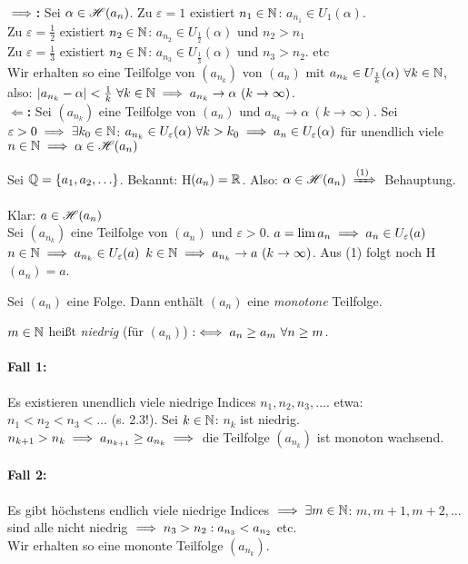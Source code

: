 \documentclass[a4paper,oneside,DIV15,BCOR12mm]{scrbook}
\begin{document}
\begin{beweise}
\item \textbf{\glqq$\implies$\grqq:} Sei $\alpha\in \mathscr{H}(a_n)$. Zu $\varepsilon = 1$ existiert $n_1\in\mathbb{N}$: $a_{n_1}\in U_1(\alpha)$. \\
Zu $\varepsilon =\frac{1}{2}$ existiert $n_2\in\mathbb{N}$: $a_{n_2} \in U_{\frac{1}{2}}(\alpha)$ und $n_2>n_1$ \\
Zu $\varepsilon =\frac{1}{3}$ existiert $n_2\in\mathbb{N}$: $a_{n_3} \in U_{\frac{1}{3}}(\alpha)$ und $n_3>n_2$. etc \\
Wir erhalten so eine Teilfolge von $(a_{n_k})$ von $(a_n)$ mit $a_{n_k} \in U_{\frac{1}{k}}(\alpha) \ \forall k\in\MdN$, also: $|a_{n_k} - \alpha| < \frac{1}{k} \ \forall k\in\MdN \folgt a_{n_k} \to \alpha \ (k\to\infty)$. \\
\textbf{\glqq$\Leftarrow$\grqq:} Sei $(a_{n_k})$ eine Teilfolge von $(a_n)$ und  $a_{n_k} \to \alpha\ (k\to\infty)$. Sei $\varepsilon > 0 \implies \exists k_0 \in\mathbb{N}$: $a_{n_k} \in U_\varepsilon(\alpha) \ \forall k>k_0 \implies a_n \in U_\varepsilon(\alpha)$ für unendlich viele $n\in\mathbb{N} \implies \alpha \in \mathscr{H}(a_n)$
\item Sei $\mathbb{Q} = \{a_1, a_2, \ldots\}$. Bekannt: H$(a_n) = \mathbb{R}$. Also: $\alpha \in \H(a_n) \folgtnach{(1)}$ Behauptung.
\item Klar: $a \in \mathscr{H}(a_n)$\\
Sei $(a_{n_k})$ eine Teilfolge von $(a_n)$ und $\varepsilon > 0 $. $a = \lim a_n \implies a_n \in U_\varepsilon(a)$ \ffa $n\in\mathbb{N} \implies a_{n_k} \in U_\varepsilon(a)$ \ffa $k\in\mathbb{N} \implies a_{n_k} \to a\ (k\to\infty)$. Aus (1) folgt noch H$(a_n) = {a}$.
\end{beweise}


\begin{hilfssatz}
Sei $(a_n)$ eine Folge. Dann enthält $(a_n)$ eine \textit{monotone} Teilfolge.
\end{hilfssatz}

\begin{beweis}
$m\in\mathbb{N}$ heißt \textit{niedrig} (für $(a_n)$) $:\iff a_n \ge a_m \ \forall n\ge m$.
\paragraph{Fall 1:} Es existieren unendlich viele niedrige Indices $n_1,n_2,n_3,\ldots$. etwa: $n_1 < n_2 < n_3 < \ldots$ (s. 2.3!). Sei $k\in\mathbb{N}$: $n_k$ ist niedrig. $n_{k+1} > n_k \implies a_{n_{k+1}} \ge a_{n_k} \implies$ die Teilfolge $(a_{n_k})$ ist monoton wachsend.
\paragraph{Fall 2:} Es gibt höchstens endlich viele niedrige Indices $\implies \exists m\in\mathbb{N}$: $m, m+1, m+2,\ldots$ sind alle nicht niedrig $\implies n_3>n_2: a_{n_3} < a_{n_2}$ etc. \\
Wir erhalten so eine mononte Teilfolge $(a_{n_k})$.
\end{beweis}
\end{document}
